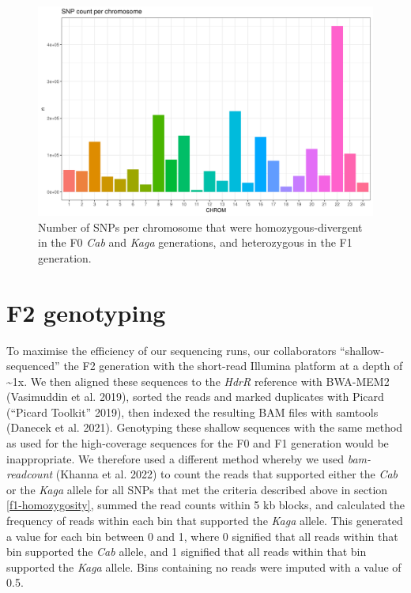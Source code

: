 \documentclass[
]{book}
\begin{document}
\begin{figure}
\includegraphics[width=1\linewidth]{figs/somites/snp_counts_per_chrom} \caption{Number of SNPs per chromosome that were homozygous-divergent in the F0 \emph{Cab} and \emph{Kaga} generations, and heterozygous in the F1 generation.}\label{fig:snp-counts-per-chrom}
\end{figure}

\hypertarget{somite-f2-sequencing}{%
\section{F2 genotyping}\label{somite-f2-sequencing}}

To maximise the efficiency of our sequencing runs, our collaborators ``shallow-sequenced'' the F2 generation with the short-read Illumina platform at a depth of \textasciitilde1x. We then aligned these sequences to the \emph{HdrR} reference with BWA-MEM2 (Vasimuddin et al. 2019), sorted the reads and marked duplicates with Picard ({``Picard Toolkit''} 2019), then indexed the resulting BAM files with samtools (Danecek et al. 2021). Genotyping these shallow sequences with the same method as used for the high-coverage sequences for the F0 and F1 generation would be inappropriate. We therefore used a different method whereby we used \emph{bam-readcount} (Khanna et al. 2022) to count the reads that supported either the \emph{Cab} or the \emph{Kaga} allele for all SNPs that met the criteria described above in section \ref{f1-homozygosity}, summed the read counts within 5 kb blocks, and calculated the frequency of reads within each bin that supported the \emph{Kaga} allele. This generated a value for each bin between 0 and 1, where 0 signified that all reads within that bin supported the \emph{Cab} allele, and 1 signified that all reads within that bin supported the \emph{Kaga} allele. Bins containing no reads were imputed with a value of 0.5.
\end{document}
